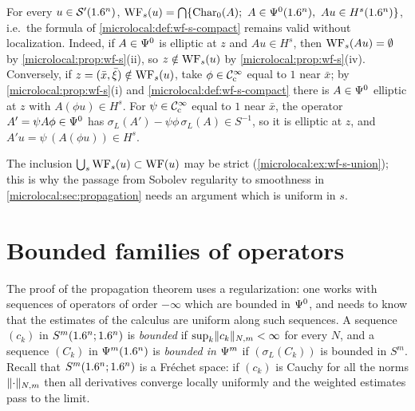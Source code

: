 \begin{remark}\label{microlocal:rem:wf-s-global}
  For every $u\in\mathcal{S}'(1.6^n)$,
  $\WF_s(u)=\bigcap\{\Char_0(A);\ A\in\Psido0(\R^n),\ Au\in H^s(\R^n)\}$,
  i.e.\ the formula of \cref{microlocal:def:wf-s-compact} remains valid
  without localization. Indeed, if $A\in\Psi^{0}$ is elliptic at $z$ and
  $Au\in H^s$, then $\operatorname{WF}_s(Au)=\emptyset$ by
  \cref{microlocal:prop:wf-s}(ii), so $z\notin\operatorname{WF}_s(u)$ by
  \cref{microlocal:prop:wf-s}(iv). Conversely, if $z=(\bar x,\bar\xi)\notin
  \operatorname{WF}_s(u)$, take $\phi\in\mathcal{C}^\infty_{\mathrm{c}}$ equal to $1$ near $\bar x$; by
  \cref{microlocal:prop:wf-s}(i) and \cref{microlocal:def:wf-s-compact} there
  is $A\in\Psi^{0}$ elliptic at $z$ with $A(\phi u)\in H^s$. For
  $\psi\in\mathcal{C}^\infty_{\mathrm{c}}$ equal to $1$ near $\bar x$, the operator $A'=\psi A\phi\in
  \Psi^{0}$ has $\sigma_L(A')-\psi\phi\,\sigma_L(A)\in S^{-1}$, so it is
  elliptic at $z$, and $A'u=\psi\,(A(\phi u))\in H^s$.
\end{remark}

The inclusion $\bigcup_s\operatorname{WF}_s(u)\subset\operatorname{WF}(u)$ may be strict
(\cref{microlocal:ex:wf-s-union}); this is why the passage from Sobolev
regularity to smoothness in \cref{microlocal:sec:propagation} needs an argument
which is uniform in $s$.

\section{Bounded families of operators}\label{microlocal:sec:families}

The proof of the propagation theorem uses a regularization: one works with
sequences of operators of order $-\infty$ which are bounded in $\Psi^{0}$, and
needs to know that the estimates of the calculus are uniform along such
sequences. A sequence $(c_k)$ in $S^m(1.6^n;1.6^n)$ is \emph{bounded} if
$\sup_k\lVert c_k\rVert_{N,m}<\infty$ for every $N$, and a sequence $(C_k)$ in
$\Psi^{m}(1.6^n)$ is \emph{bounded in $\Psi^{m}$} if $(\sigma_L(C_k))$ is bounded
in $S^m$. Recall that $S^m(1.6^n;1.6^n)$ is a Fréchet space: if $(c_k)$ is
Cauchy for all the norms $\lVert \cdot\rVert_{N,m}$ then all derivatives converge
locally uniformly and the weighted estimates pass to the limit.

